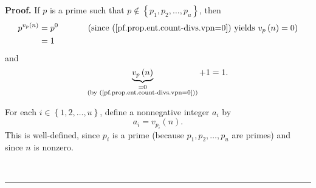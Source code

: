\documentclass[numbers=enddot,12pt,final,onecolumn,notitlepage]{scrartcl}%
\numberwithin{exer}{subsection}
\theoremstyle{definition}
\newenvironment{proof}[1][Proof]{\noindent\textbf{#1.} }{\ \rule{0.5em}{0.5em}}
\begin{document}
\begin{proof}
If $p$ is a prime such that $p\notin\left\{  p_{1},p_{2},\ldots,p_{u}\right\}
$, then%
\begin{align}
p^{v_{p}\left(  n\right)  }  &  =p^{0}\ \ \ \ \ \ \ \ \ \ \left(  \text{since
(\ref{pf.prop.ent.count-divs.vpn=0}) yields }v_{p}\left(  n\right)  =0\right)
\label{pf.prop.ent.count-divs.pvpn=1}\\
&  =1\nonumber
\end{align}
and%
\begin{equation}
\underbrace{v_{p}\left(  n\right)  }_{\substack{=0\\\text{(by
(\ref{pf.prop.ent.count-divs.vpn=0}))}}}+1=1.
\label{pf.prop.ent.count-divs.vpn+1=1}%
\end{equation}


For each $i\in\left\{  1,2,\ldots,u\right\}  $, define a nonnegative integer
$a_{i}$ by%
\begin{equation}
a_{i}=v_{p_{i}}\left(  n\right)  . \label{pf.prop.ent.count-divs.ai=}%
\end{equation}
This is well-defined, since $p_{i}$ is a prime (because $p_{1},p_{2}%
,\ldots,p_{u}$ are primes) and since $n$ is nonzero.


\end{proof}
\end{document}
